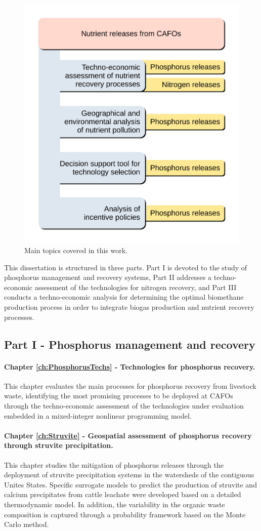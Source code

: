 \begin{refsection}[referencesCh1]
\begin{figure}[h]
	\centering
	\includegraphics[width=0.6\linewidth, trim={1cm 1cm 1cm 1cm},clip]{gfx/Chapter1/IntroFig2_1.pdf} 
	\caption{Main topics covered in this work.}
	\label{fig:Ch1WorkThesis}
\end{figure}

This dissertation is structured in three parts. Part I is devoted to the study of phosphorus management and recovery systems, Part II addresses a techno-economic assessment of the technologies for nitrogen recovery, and Part III conducts a techno-economic analysis for determining the
optimal biomethane production process in order to integrate biogas production and nutrient recovery processes.

\subsection{Part I - Phosphorus management and recovery}
\paragraph{Chapter \ref{ch:PhosphorusTechs} - Technologies for phosphorus recovery.} This chapter evaluates the main processes for phosphorus recovery from livestock waste, identifying the most promising processes to be deployed at CAFOs through the techno-economic assessment of the technologies under evaluation embedded in a mixed-integer nonlinear programming model.

\paragraph{Chapter \ref{ch:Struvite} - Geospatial assessment of phosphorus recovery through struvite precipitation.} This chapter studies the mitigation of phosphorus releases through the deployment of struvite precipitation systems in the watersheds of the contiguous Unites States. Specific surrogate models to predict the production of struvite and calcium precipitates from cattle leachate were developed based on a detailed thermodynamic model. In addition, the variability in the organic waste composition is captured through a probability framework based on the Monte Carlo method.


\end{refsection}
